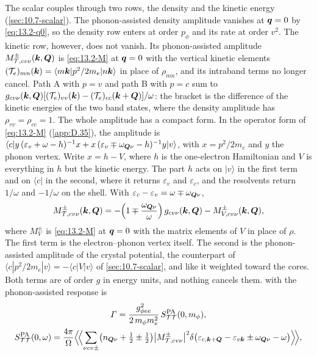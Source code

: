 The scalar couples through two rows, the density and the kinetic energy (\cref{sec:10.7-scalar}). The phonon-assisted density amplitude vanishes at $\bm{q} = 0$ by \cref{eq:13.2-q0}, so the density row enters at order $p_\phi$ and its rate at order $v^2$. The kinetic row, however, does not vanish. Its phonon-assisted amplitude $M^\pm_{\mathcal{T},cv\nu}(\bm{k},\bm{Q})$ is \cref{eq:13.2-M} at $\bm{q} = 0$ with the vertical kinetic elements $(\mathcal{T}_e)_{mn}(\bm{k}) = \langle m\bm{k}|p^2/2m_e|n\bm{k}\rangle$ in place of $\rho_{mn}$, and its intraband terms no longer cancel. Path A with $p = v$ and path B with $p = c$ sum to $g_{cv\nu}(\bm{k},\bm{Q})[(\mathcal{T}_e)_{vv}(\bm{k}) - (\mathcal{T}_e)_{cc}(\bm{k}+\bm{Q})]/\omega$: the bracket is the difference of the kinetic energies of the two band states, where the density amplitude has $\rho_{vv} = \rho_{cc} = 1$. The whole amplitude has a compact form. In the operator form of \cref{eq:13.2-M} (\cref{app:D.35}), the amplitude is $\langle c|y\,(\varepsilon_v + \omega - h)^{-1}x + x\,(\varepsilon_v \mp \omega_{\bm{Q}\nu} - h)^{-1}y|v\rangle$, with $x = p^2/2m_e$ and $y$ the phonon vertex. Write $x = h - V$, where $h$ is the one-electron Hamiltonian and $V$ is everything in $h$ but the kinetic energy. The part $h$ acts on $|v\rangle$ in the first term and on $\langle c|$ in the second, where it returns $\varepsilon_v$ and $\varepsilon_c$, and the resolvents return $1/\omega$ and $-1/\omega$ on the shell. With $\varepsilon_c - \varepsilon_v = \omega \mp \omega_{\bm{Q}\nu}$,
\begin{equation}
  M^\pm_{\mathcal{T},cv\nu}(\bm{k},\bm{Q}) = -\Bigl(1 \mp \frac{\omega_{\bm{Q}\nu}}{\omega}\Bigr)\,g_{cv\nu}(\bm{k},\bm{Q}) - M^\pm_{V,cv\nu}(\bm{k},\bm{Q}) ,
  \label{eq:13.8-MT}
\end{equation}
where $M^\pm_V$ is \cref{eq:13.2-M} at $\bm{q} = 0$ with the matrix elements of $V$ in place of $\rho$. The first term is the electron--phonon vertex itself. The second is the phonon-assisted amplitude of the crystal potential, the counterpart of $\langle c|p^2/2m_e|v\rangle = -\langle c|V|v\rangle$ of \cref{sec:10.7-scalar}, and like it weighted toward the cores. Both terms are of order $g$ in energy units, and nothing cancels them.  with the phonon-assisted response is
\begin{equation}
  \begin{gathered}
  \varGamma = \frac{g_{\phi ee}^2}{2\,m_\phi m_e^2}\,S^{\mathrm{PA}}_{\mathcal{T}\mathcal{T}}(0,m_\phi) , \\
  S^{\mathrm{PA}}_{\mathcal{T}\mathcal{T}}(0,\omega) = \frac{4\pi}{\Omega}\Bigl\langle\!\Bigl\langle\sum_{\nu cv\pm}\bigl(n_{\bm{Q}\nu} + \tfrac12 \pm \tfrac12\bigr)\bigl|M^\pm_{\mathcal{T},cv\nu}\bigr|^2\delta\bigl(\varepsilon_{c,\bm{k}+\bm{Q}} - \varepsilon_{v\bm{k}} \pm \omega_{\bm{Q}\nu} - \omega\bigr)\Bigr\rangle\!\Bigr\rangle ,
  \end{gathered}
  \label{eq:13.8-scalar}
\end{equation}
